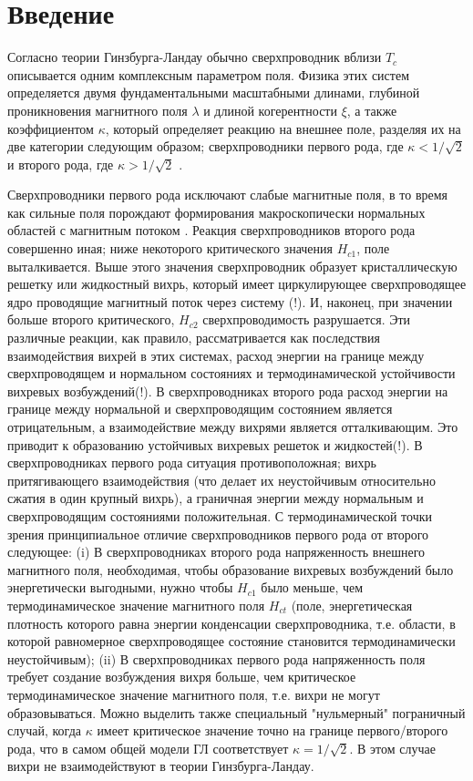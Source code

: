 \chapter{Введение}

Согласно теории Гинзбурга-Ландау обычно сверхпроводник вблизи \( T_c \) 
описывается одним комплексным параметром поля. Физика этих систем определяется 
двумя фундаментальными масштабными длинами, глубиной проникновения магнитного 
поля \( \lambda \) и длиной когерентности \( \xi \), а также коэффициентом 
\( \kappa \), который определяет реакцию на внешнее поле, разделяя их на две  
категории следующим образом; сверхпроводники первого рода, где 
\( \kappa < 1/\sqrt{2} \) и второго рода, где \( \kappa > 1/\sqrt{2} \) 
\cite{bib:3}.

Сверхпроводники первого рода исключают слабые магнитные поля, в то время как 
сильные поля порождают формирования макроскопически нормальных областей с 
магнитным потоком \cite{bib:4}. Реакция сверхпроводников второго рода 
совершенно иная; ниже некоторого критического значения \( H_{c1} \), поле 
выталкивается. Выше этого значения сверхпроводник образует кристаллическую 
решетку или жидкостный вихрь, который имеет циркулирующее сверхпроводящее 
ядро проводящие магнитный поток через систему (!). И, наконец, при значении 
больше второго критического, \( H_{c2} \) сверхпроводимость разрушается. Эти 
различные реакции, как правило, рассматривается как последствия взаимодействия 
вихрей в этих системах, расход энергии на границе между сверхпроводящем и 
нормальном состояниях и термодинамической устойчивости вихревых возбуждений(!). 
В сверхпроводниках второго рода расход энергии на границе между нормальной и 
сверхпроводящим состоянием является отрицательным, а взаимодействие между 
вихрями является отталкивающим\cite{bib:3}. Это приводит к образованию 
устойчивых вихревых решеток и жидкостей(!). В сверхпроводниках первого рода 
ситуация противоположная; вихрь притягивающего взаимодействия (что делает их 
неустойчивым относительно сжатия в один крупный вихрь), а граничная энергии 
между нормальным и сверхпроводящим состояниями положительная. С 
термодинамической точки зрения принципиальное отличие сверхпроводников первого 
рода от второго следующее: (i) В сверхпроводниках второго рода напряженность 
внешнего магнитного поля, необходимая, чтобы образование вихревых возбуждений 
было энергетически выгодными, нужно чтобы \( H_{c1} \) было меньше, чем 
термодинамическое значение магнитного поля \( H_{ct} \) (поле, энергетическая
плотность которого равна энергии конденсации сверхпроводника, т.е. области, в 
которой равномерное сверхпроводящее состояние становится термодинамически 
неустойчивым); (ii) В сверхпроводниках первого рода напряженность поля требует 
создание возбуждения вихря больше, чем критическое термодинамическое значение 
магнитного поля, т.е. вихри не могут образовываться. Можно выделить также 
специальный "нульмерный" пограничный случай, когда \( \kappa \) имеет 
критическое значение точно на границе первого/второго рода, что в самом общей 
модели ГЛ соответствует \( \kappa = 1/\sqrt{2} \). В этом случае вихри не 
взаимодействуют\cite{bib:5} в теории Гинзбурга-Ландау.

